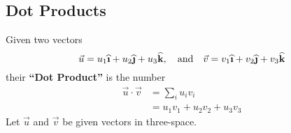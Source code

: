 \subsection{Dot Products}
Given two vectors
\begin{equation}
\vec{u}=u_{1}\widehat{\textbf{\i}}+u_{2}\widehat{\textbf{\j}}+u_{3}\widehat{\textbf{k}},\quad\mbox{and}\quad
\vec{v}=v_{1}\widehat{\textbf{\i}}+v_{2}\widehat{\textbf{\j}}+v_{3}\widehat{\textbf{k}}
\end{equation}
their \textbf{``Dot Product''} is the number
\begin{equation}
\begin{aligned}
\vec{u}\cdot\vec{v} &= \sum_{i} u_{i}v_{i}\\
&= u_{1}v_{1}+u_{2}v_{2}+u_{3}v_{3}
\end{aligned}
\end{equation}
Let $\vec{u}$ and $\vec{v}$ be given vectors in three-space. 

